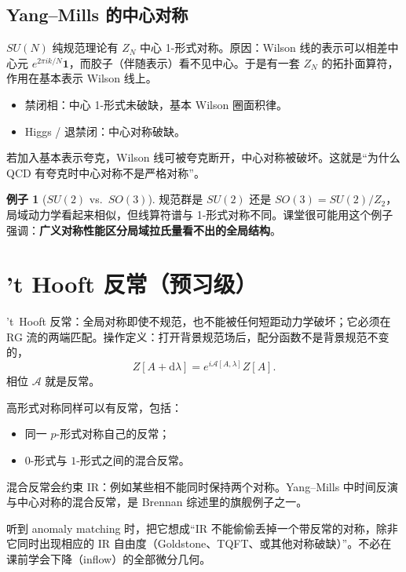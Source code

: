 \documentclass[11pt,a4paper]{article}
\theoremstyle{definition}
\newtheorem{example}{例子}[section]
\theoremstyle{plain}
\theoremstyle{remark}
\newcommand{\dd}{\mathrm{d}}
\begin{document}
\subsection{Yang--Mills 的中心对称}

$SU(N)$ 纯规范理论有 $Z_N$ 中心 1-形式对称。原因：Wilson 线的表示可以相差中心元 $e^{2\pi i k/N}\mathbf{1}$，而胶子（伴随表示）看不见中心。于是有一套 $Z_N$ 的拓扑面算符，作用在基本表示 Wilson 线上。

\begin{itemize}[leftmargin=1.4em]
  \item 禁闭相：中心 1-形式未破缺，基本 Wilson 圈面积律。
  \item Higgs / 退禁闭：中心对称破缺。
\end{itemize}
若加入基本表示夸克，Wilson 线可被夸克断开，中心对称被破坏。这就是``为什么 QCD 有夸克时中心对称不是严格对称''。

\begin{example}[$SU(2)$ vs.\ $SO(3)$]
规范群是 $SU(2)$ 还是 $SO(3)=SU(2)/Z_2$，局域动力学看起来相似，但线算符谱与 1-形式对称不同。课堂很可能用这个例子强调：\textbf{广义对称性能区分局域拉氏量看不出的全局结构}。
\end{example}

\section{'t Hooft 反常（预习级）}
\label{sec:anomaly}

't~Hooft 反常：全局对称即使不规范，也不能被任何短距动力学破坏；它必须在 RG 流的两端匹配。操作定义：打开背景规范场后，配分函数不是背景规范不变的，
\begin{equation}
  Z[A+\dd\lambda]=e^{i\mathcal{A}[A,\lambda]}Z[A].
\end{equation}
相位 $\mathcal{A}$ 就是反常。

高形式对称同样可以有反常，包括：
\begin{itemize}[leftmargin=1.4em]
  \item 同一 $p$-形式对称自己的反常；
  \item $0$-形式与 $1$-形式之间的混合反常。
\end{itemize}
混合反常会约束 IR：例如某些相不能同时保持两个对称。Yang--Mills 中时间反演与中心对称的混合反常，是 Brennan 综述里的旗舰例子之一。

\begin{hearbox}
听到 anomaly matching 时，把它想成``IR 不能偷偷丢掉一个带反常的对称，除非它同时出现相应的 IR 自由度（Goldstone、TQFT、或其他对称破缺）''。不必在课前学会下降（inflow）的全部微分几何。
\end{hearbox}
\end{document}
